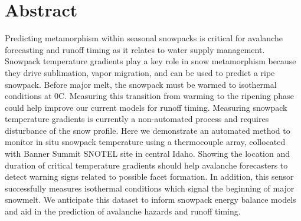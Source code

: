 \chapter*{Abstract}

Predicting metamorphism within seasonal snowpacks is critical for avalanche forecasting and runoff timing as it relates to water supply management. Snowpack temperature gradients play a key role in snow metamorphism because they drive sublimation, vapor migration, and can be used to predict a ripe snowpack. Before major melt, the snowpack must be warmed to isothermal conditions at 0C. Measuring this transition from warming to the ripening phase could help improve our current models for runoff timing. Measuring snowpack temperature gradients is currently a non-automated process and requires disturbance of the snow profile. Here we demonstrate an automated method to monitor in situ snowpack temperature using a thermocouple array, collocated with Banner Summit SNOTEL site in central Idaho. Showing the location and duration of critical temperature gradients should help avalanche forecasters to detect warning signs related to possible facet formation. In addition, this sensor successfully measures isothermal conditions which signal the beginning of major snowmelt. We anticipate this dataset to inform snowpack energy balance models and aid in the prediction of avalanche hazards and runoff timing.
